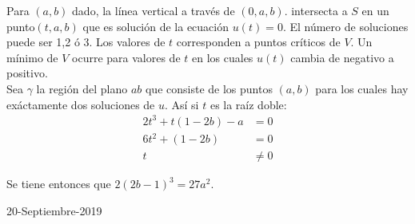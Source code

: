 Para $(a,b)$ dado, la línea vertical a través de $(0,a,b)$. intersecta a $S$ en
un punto$(t,a,b)$ que es solución de la ecuación $u(t)=0$. El número de
soluciones puede ser 1,2 ó 3. Los valores de $t$ corresponden a puntos críticos
de $V$. Un mínimo de $V$ ocurre para valores de $t$ en los cuales $u(t)$ cambia
de negativo a positivo. \\
Sea $\gamma$ la región del plano $ab$ que consiste de los puntos $(a,b)$ para
los cuales hay exáctamente dos soluciones de $u$. 
Así si $t$ es la raíz doble:
\begin{align}
  2t^3 + t(1-2b) -a &= 0 \\ 
  6t^2 +(1-2b) &= 0 \\
  t &\neq 0 
\end{align}

Se tiene entonces que $2(2b -1)^3 = 27a^2$.

20-Septiembre-2019

